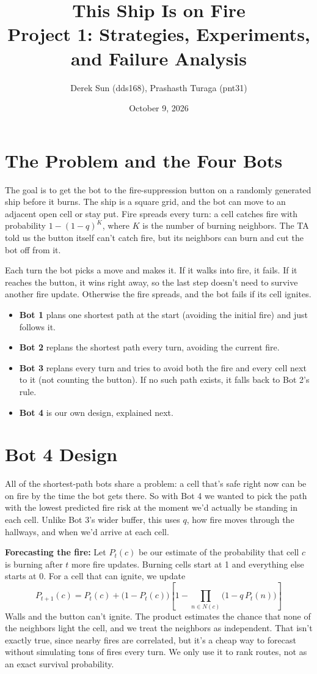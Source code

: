 \documentclass[11pt]{article}
\title{This Ship Is on Fire\\\large Project 1: Strategies, Experiments, and Failure Analysis}
\author{Derek Sun (dds168), Prashasth Turaga (pnt31)}
\date{October 9, 2026}
\begin{document}
\maketitle

\section{The Problem and the Four Bots}

The goal is to get the bot to the fire-suppression button on a randomly generated ship before it burns. The ship is a square grid, and the bot can move to an adjacent open cell or stay put. Fire spreads every turn: a cell catches fire with probability $1 - (1-q)^K$, where $K$ is the number of burning neighbors. The TA told us the button itself can't catch fire, but its neighbors can burn and cut the bot off from it.

Each turn the bot picks a move and makes it. If it walks into fire, it fails. If it reaches the button, it wins right away, so the last step doesn't need to survive another fire update. Otherwise the fire spreads, and the bot fails if its cell ignites.

\begin{itemize}
  \item \textbf{Bot 1} plans one shortest path at the start (avoiding the initial fire) and just follows it.
  \item \textbf{Bot 2} replans the shortest path every turn, avoiding the current fire.
  \item \textbf{Bot 3} replans every turn and tries to avoid both the fire and every cell next to it (not counting the button). If no such path exists, it falls back to Bot 2's rule.
  \item \textbf{Bot 4} is our own design, explained next.
\end{itemize}

\section{Bot 4 Design}

All of the shortest-path bots share a problem: a cell that's safe right now can be on fire by the time the bot gets there. So with Bot 4 we wanted to pick the path with the lowest predicted fire risk at the moment we'd actually be standing in each cell. Unlike Bot 3's wider buffer, this uses $q$, how fire moves through the hallways, and when we'd arrive at each cell.

\textbf{Forecasting the fire:} Let $P_t(c)$ be our estimate of the probability that cell $c$ is burning after $t$ more fire updates. Burning cells start at 1 and everything else starts at 0. For a cell that can ignite, we update
\[
P_{t+1}(c) = P_t(c) + \bigl(1 - P_t(c)\bigr)\left[1 - \prod_{n \in N(c)} \bigl(1 - q\,P_t(n)\bigr)\right]
\]
Walls and the button can't ignite. The product estimates the chance that none of the neighbors light the cell, and we treat the neighbors as independent. That isn't exactly true, since nearby fires are correlated, but it's a cheap way to forecast without simulating tons of fires every turn. We only use it to rank routes, not as an exact survival probability.
\end{document}
